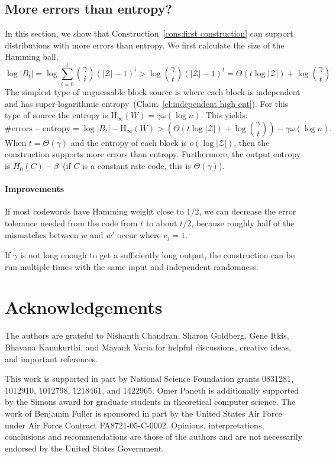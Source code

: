 \documentclass[11pt]{article}
\newcommand{\clref}[1]{\mbox{Claim~\ref{#1}}}
\newcommand{\consref}[1]{\mbox{Construction~\ref{#1}}}
\newcommand{\Hoo}{\mathrm{H}_\infty}
\newcommand{\blind}[1]{{#1}}
\newcommand{\blind}[1]{}
\begin{document}
\subsection{More errors than entropy?}
\label{sec:discussion}
In this section, we show that \consref{cons:first construction} can support distributions with more errors than entropy.
We first calculate the size of the Hamming ball.
\[
\log |B_t| = \log \sum_{i=0}^t {\gamma \choose i} (|\mathcal{Z}|-1)^i> \log {\gamma \choose t} (|\mathcal{Z}|-1)^t =\Theta(t\log |\mathcal{Z}|) + \log {\gamma\choose t}
\]
The simplest type of unguessable block source is where each block is independent and has super-logarithmic entropy~(\clref{cl:independent high ent}).  For this type of source the entropy is $\Hoo(W) = \gamma\omega(\log n)$.  This yields:
\[
\text{\# errors} - \text{entropy} = \log |B_t| -  \Hoo(W)  >\left( \Theta(t\log |\mathcal{Z}|) + \log {\gamma \choose t}\right) -  \gamma \omega(\log n) .
\]
When $t =\Theta(\gamma)$ and the entropy of each block is $o(\log |\mathcal{Z}|)$, then the construction supports more errors than entropy. Furthermore, the output entropy is $H_0(C) -\beta$~(if $C$ is a constant rate code, this is $\Theta(\gamma)$).

\paragraph{Improvements}  If most codewords have Hamming weight close to $1/2$, we can decrease the error tolerance needed from the code from $t$ to  about $t/2$, because roughly half of the mismatches between $w$ and $w'$ occur where $c_j =1$.

If $\gamma$ is not long enough to get a sufficiently long output, the construction can be run multiple times with the same input and independent randomness.

\blind{
\section*{Acknowledgements}
The authors are grateful to Nishanth Chandran, Sharon Goldberg, Gene Itkis, Bhavana Kanukurthi, and Mayank Varia for helpful discussions, creative ideas, and important references.

This work is supported in part by National Science Foundation grants 0831281, 1012910, 1012798, 1218461, and 1422965.
Omer Paneth is additionally supported by the Simons award for graduate students in theoretical computer science.
The work of Benjamin Fuller is sponsored in part by the United States Air Force under Air Force Contract FA8721-05-C-0002. Opinions, interpretations, conclusions and recommendations are those of the authors and are not necessarily endorsed by the United States Government. 
}


\end{document}
